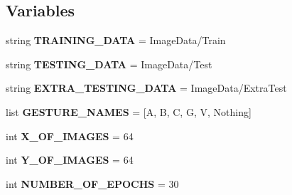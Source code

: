 \subsection*{Variables}
\begin{DoxyCompactItemize}
\item 
\mbox{\label{namespaceCreateModel_a9f0bc6431cc83069b693958a7b0c2309}} 
string {\bfseries T\+R\+A\+I\+N\+I\+N\+G\+\_\+\+D\+A\+TA} = \textquotesingle{}Image\+Data/Train\textquotesingle{}
\item 
\mbox{\label{namespaceCreateModel_a44d00c59bf3ee18a9c78b79bf92d3fe5}} 
string {\bfseries T\+E\+S\+T\+I\+N\+G\+\_\+\+D\+A\+TA} = \textquotesingle{}Image\+Data/Test\textquotesingle{}
\item 
\mbox{\label{namespaceCreateModel_a572af130af697bdbac12baef11ee7bc2}} 
string {\bfseries E\+X\+T\+R\+A\+\_\+\+T\+E\+S\+T\+I\+N\+G\+\_\+\+D\+A\+TA} = \textquotesingle{}Image\+Data/Extra\+Test\textquotesingle{}
\item 
\mbox{\label{namespaceCreateModel_a1a30a9f91b8da29f5b1ee6f5cfba8c74}} 
list {\bfseries G\+E\+S\+T\+U\+R\+E\+\_\+\+N\+A\+M\+ES} = \mbox{[}\textquotesingle{}A\textquotesingle{}, \textquotesingle{}B\textquotesingle{}, \textquotesingle{}C\textquotesingle{}, \textquotesingle{}G\textquotesingle{}, \textquotesingle{}V\textquotesingle{}, \textquotesingle{}Nothing\textquotesingle{}\mbox{]}
\item 
\mbox{\label{namespaceCreateModel_a98583f9cbb5b32917eec895bbd7186dd}} 
int {\bfseries X\+\_\+\+O\+F\+\_\+\+I\+M\+A\+G\+ES} = 64
\item 
\mbox{\label{namespaceCreateModel_aa5ce535c8a1341fc751a755d6d36e353}} 
int {\bfseries Y\+\_\+\+O\+F\+\_\+\+I\+M\+A\+G\+ES} = 64
\item 
\mbox{\label{namespaceCreateModel_af27302be2f29c6fb8905f6888584f542}} 
int {\bfseries N\+U\+M\+B\+E\+R\+\_\+\+O\+F\+\_\+\+E\+P\+O\+C\+HS} = 30
\item 
\mbox{\label{namespaceCreateModel_a7bc3a7b80845927156b38b68d85d44a6}} 

\end{DoxyCompactItemize}
